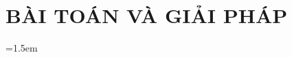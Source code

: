 \documentclass[a4paper]{report}
\begin{document}


\pagestyle{empty}

\tableofcontents
\thispagestyle{empty}
\cleardoublepage
\renewcommand{\listfigurename}{DANH MỤC HÌNH VẼ}
{\let\oldnumberline\numberline
\renewcommand{\numberline}{Hình~\oldnumberline}
\listoffigures}
\newpage
\renewcommand{\listtablename}{DANH MỤC BẢNG BIỂU}
{\let\oldnumberline\numberline
\renewcommand{\numberline}{Bảng~\oldnumberline}
\listoftables}
\glsaddall
\renewcommand*{\glossaryname}{Danh sách thuật ngữ}
\renewcommand*{\acronymname}{DANH MỤC THUẬT NGỮ VÀ TỪ VIẾT TẮT}
\renewcommand*{\entryname}{Thuật ngữ}
\renewcommand*{\descriptionname}{Ý nghĩa}
\printnoidxglossary[type=\acronymtype]
\newpage
{}
\pagestyle{fancy}
\fancyhf{}
\fancyhead[L]{\leftmark}
\fancyfoot[C]{\thepage}
\chapter{BÀI TOÁN VÀ GIẢI PHÁP}
\label{chap:bai-toan}








\newpage
\renewcommand\bibname{TÀI LIỆU THAM KHẢO}
\begingroup
\emergencystretch=1.5em
\printbibliography[heading=bibintoc,title={TÀI LIỆU THAM KHẢO}]
\endgroup
\end{document}
